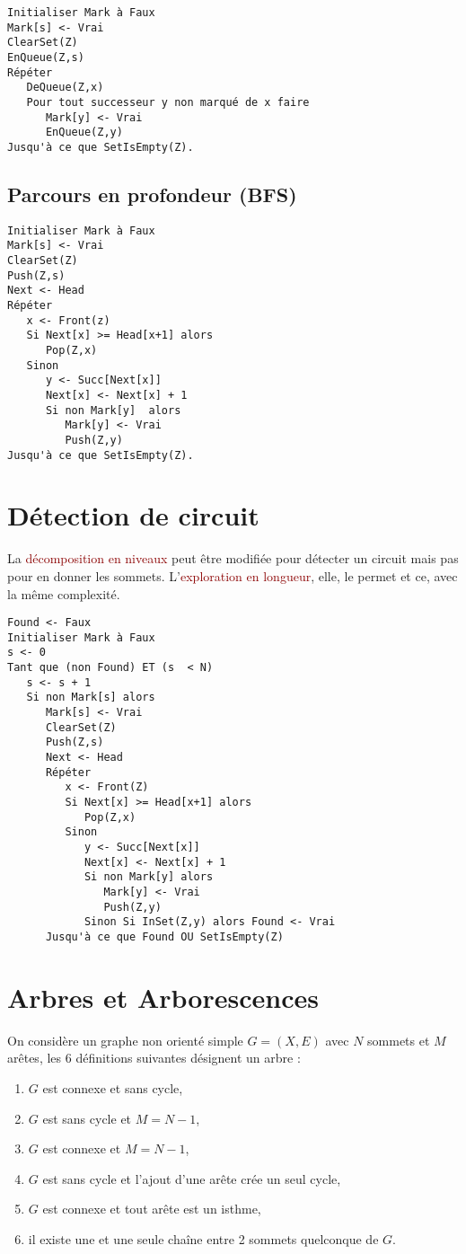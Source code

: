 \documentclass{article}
\newcommand{\red}[1]{\textcolor{darkred}{#1}}
\begin{document}
\begin{verbatim}
Initialiser Mark à Faux
Mark[s] <- Vrai
ClearSet(Z)
EnQueue(Z,s)
Répéter
   DeQueue(Z,x)
   Pour tout successeur y non marqué de x faire
      Mark[y] <- Vrai
      EnQueue(Z,y)
Jusqu'à ce que SetIsEmpty(Z).
\end{verbatim}

\subsection{Parcours en profondeur (BFS)}

\begin{verbatim}
Initialiser Mark à Faux
Mark[s] <- Vrai
ClearSet(Z)
Push(Z,s)
Next <- Head
Répéter
   x <- Front(z)
   Si Next[x] >= Head[x+1] alors
      Pop(Z,x)
   Sinon
      y <- Succ[Next[x]]
      Next[x] <- Next[x] + 1
      Si non Mark[y]  alors
         Mark[y] <- Vrai
         Push(Z,y)
Jusqu'à ce que SetIsEmpty(Z).
\end{verbatim}

\section{Détection de circuit}

\noindent La \red{décomposition en niveaux} peut être modifiée pour détecter un circuit mais pas pour en donner les sommets. L'\red{exploration en longueur}, elle, le permet et 
ce, avec la même complexité.
\begin{verbatim}
Found <- Faux
Initialiser Mark à Faux
s <- 0
Tant que (non Found) ET (s  < N)
   s <- s + 1
   Si non Mark[s] alors
      Mark[s] <- Vrai
      ClearSet(Z)
      Push(Z,s)
      Next <- Head
      Répéter
         x <- Front(Z)
         Si Next[x] >= Head[x+1] alors
            Pop(Z,x)
         Sinon
            y <- Succ[Next[x]]
            Next[x] <- Next[x] + 1
            Si non Mark[y] alors
               Mark[y] <- Vrai
               Push(Z,y)
            Sinon Si InSet(Z,y) alors Found <- Vrai
      Jusqu'à ce que Found OU SetIsEmpty(Z)
\end{verbatim}

\section{Arbres et Arborescences}

On considère un graphe non orienté simple $G=(X,E)$ avec $N$ sommets et $M$ arêtes, les 6 définitions suivantes désignent un arbre :
\begin{enumerate}
\item $G$ est connexe et sans cycle,
\item $G$ est sans cycle et $M=N-1$,
\item $G$ est connexe et $M=N-1$,
\item $G$ est sans cycle et l'ajout d'une arête crée un seul cycle,
\item $G$ est connexe et tout arête est un isthme,
\item il existe une et une seule chaîne entre 2 sommets quelconque de $G$.
\end{enumerate}
\end{document}
